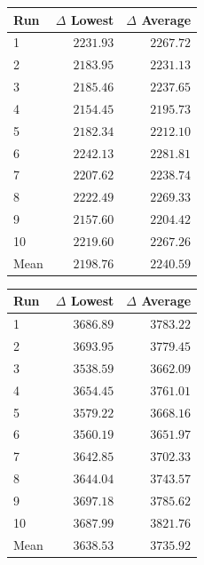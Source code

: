 \begin{table}[H]
    \centering
    \begin{minipage}[t]{0.48\textwidth}
        \centering
        \label{tab:gain-uniform-barabasi-albert-1}
        \small
        \setlength{\tabcolsep}{4pt}
        \begin{tabular}{lrr}
            \toprule
            \textbf{Run} & \textbf{$\Delta$ Lowest} & \textbf{$\Delta$ Average} \\
            \midrule
            1 & $2231.93$ & $2267.72$ \\
            2 & $2183.95$ & $2231.13$ \\
            3 & $2185.46$ & $2237.65$ \\
            4 & $2154.45$ & $2195.73$ \\
            5 & $2182.34$ & $2212.10$ \\
            6 & $2242.13$ & $2281.81$ \\
            7 & $2207.62$ & $2238.74$ \\
            8 & $2222.49$ & $2269.33$ \\
            9 & $2157.60$ & $2204.42$ \\
            10 & $2219.60$ & $2267.26$ \\
            \midrule
            Mean & $2198.76$ & $2240.59$ \\
            \bottomrule
        \end{tabular}
    \end{minipage}
    \hfill
    \begin{minipage}[t]{0.48\textwidth}
        \centering
        \label{tab:gain-normal-barabasi-albert-1}
        \small
        \setlength{\tabcolsep}{4pt}
        \begin{tabular}{lrr}
            \toprule
            \textbf{Run} & \textbf{$\Delta$ Lowest} & \textbf{$\Delta$ Average} \\
            \midrule
            1 & $3686.89$ & $3783.22$ \\
            2 & $3693.95$ & $3779.45$ \\
            3 & $3538.59$ & $3662.09$ \\
            4 & $3654.45$ & $3761.01$ \\
            5 & $3579.22$ & $3668.16$ \\
            6 & $3560.19$ & $3651.97$ \\
            7 & $3642.85$ & $3702.33$ \\
            8 & $3644.04$ & $3743.57$ \\
            9 & $3697.18$ & $3785.62$ \\
            10 & $3687.99$ & $3821.76$ \\
            \midrule
            Mean & $3638.53$ & $3735.92$ \\
            \bottomrule
        \end{tabular}
    \end{minipage}
\end{table}

